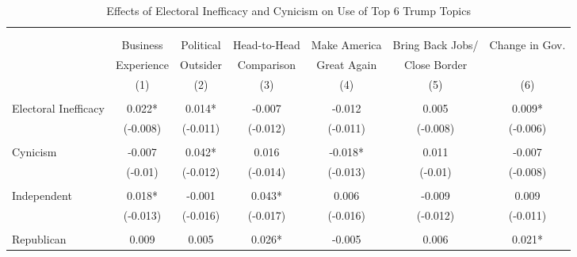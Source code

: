 \documentclass[12pt]{article}
\begin{document}
\begin{appendices}
\begin{refsection}
\begin{table}[!ht] \centering 
  \caption{Effects of Electoral Inefficacy and Cynicism on Use of Top 6 Trump Topics}\vspace*{-0.25cm}
  \label{tab:outsider-trump} 
    \renewcommand{\arraystretch}{0.5}
    \begin{adjustbox}{width=\textwidth,center}
\begin{tabular}{@{\extracolsep{5pt}}lcccccc} 
\\[-1.3ex]
\hline\hline \\[-1.8ex] 
\\[-1ex] 
                     & Business   & Political & Head-to-Head & Make America & Bring Back Jobs/ & Change in Gov. \\
                     & Experience & Outsider  & Comparison   & Great Again  & Close Border     &                \\
                     & (1)        & (2)       & (3)          & (4)          & (5)              & (6)            \\ \hline \\
Electoral Inefficacy & 0.022*             & 0.014*   & -0.007    & -0.012            & 0.005    & 0.009*        \\
                     & (-0.008)           & (-0.011) & (-0.012)  & (-0.011)          & (-0.008) & (-0.006)      \\
                     &                    &          &           &                   &          &               \\
Cynicism             & -0.007             & 0.042*   & 0.016     & -0.018*           & 0.011    & -0.007        \\
                     & (-0.01)            & (-0.012) & (-0.014)  & (-0.013)          & (-0.01)  & (-0.008)      \\
                     &                    &          &           &                   &          &               \\
Independent          & 0.018*             & -0.001   & 0.043*    & 0.006             & -0.009   & 0.009         \\
                     & (-0.013)           & (-0.016) & (-0.017)  & (-0.016)          & (-0.012) & (-0.011)      \\
                     &                    &          &           &                   &          &               \\
Republican           & 0.009              & 0.005    & 0.026*    & -0.005            & 0.006    & 0.021*        \\

\end{tabular}
\end{adjustbox}
\end{table}
\end{refsection}
\end{appendices}
\end{document}
